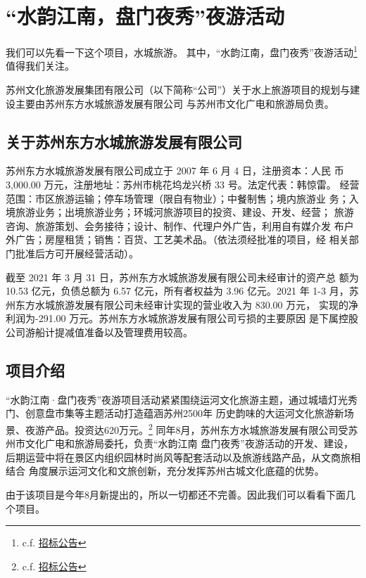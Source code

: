 \documentclass[H:\workspace\担保人财务信息2\杭州大运河\HangZhouText.tex]{subfiles}
\begin{document}
\section{“水韵江南，盘门夜秀”夜游活动}
我们可以先看一下这个项目，水城旅游。
其中，“水韵江南，盘门夜秀”夜游活动\footnote{c.f. \href{http://www.zbwmy.com/150/154/2021/10/08/32129365.html}{招标公告}} 值得我们关注。\par 
苏州文化旅游发展集团有限公司（以下简称“公司”）关于水上旅游项目的规划与建设主要由苏州东方水城旅游发展有限公司
与苏州市文化广电和旅游局负责。\par 
\subsection{关于苏州东方水城旅游发展有限公司}
苏州东方水城旅游发展有限公司成立于 2007 年 6 月 4 日，注册资本：人民
币 3,000.00 万元，注册地址：苏州市桃花坞龙兴桥 33 号。法定代表：韩惊雷。
经营范围：市区旅游运输；停车场管理（限自有物业）；中餐制售；境内旅游业
务；入境旅游业务；出境旅游业务；环城河旅游项目的投资、建设、开发、经营；
旅游咨询、旅游策划、会务接待；设计、制作、代理户外广告，利用自有媒介发
布户外广告；房屋租赁；销售：百货、工艺美术品。（依法须经批准的项目，经
相关部门批准后方可开展经营活动）。\par 
截至 2021 年 3 月 31 日，苏州东方水城旅游发展有限公司未经审计的资产总
额为 10.53 亿元，负债总额为 6.57 亿元，所有者权益为 3.96 亿元。2021 年 1-3
月，苏州东方水城旅游发展有限公司未经审计实现的营业收入为 830.00 万元，
实现的净利润为-291.00 万元。苏州东方水城旅游发展有限公司亏损的主要原因
是下属控股公司游船计提减值准备以及管理费用较高。
    
\subsection{项目介绍}
“水韵江南·盘门夜秀”夜游项目活动紧紧围绕运河文化旅游主题，通过城墙灯光秀门、创意盘市集等主题活动打造蕴涵苏州2500年
历史韵味的大运河文化旅游新场景、夜游产品。投资达620万元。\footnote{c.f. \href{http://czju.suzhou.gov.cn/zfcg/html/project/1b96750caa1b4973bacff49e3935a330.shtml}{招标公告}}
同年8月，苏州东方水城旅游发展有限公司受苏州市文化广电和旅游局委托，负责“水韵江南 盘门夜秀”夜游活动的开发、建设，
后期运营中将在景区内组织园林时尚风等配套活动以及旅游线路产品，从文商旅相结合
角度展示运河文化和文旅创新，充分发挥苏州古城文化底蕴的优势。\par 
由于该项目是今年8月新提出的，所以一切都还不完善。因此我们可以看看下面几个项目。
    
\end{document}

